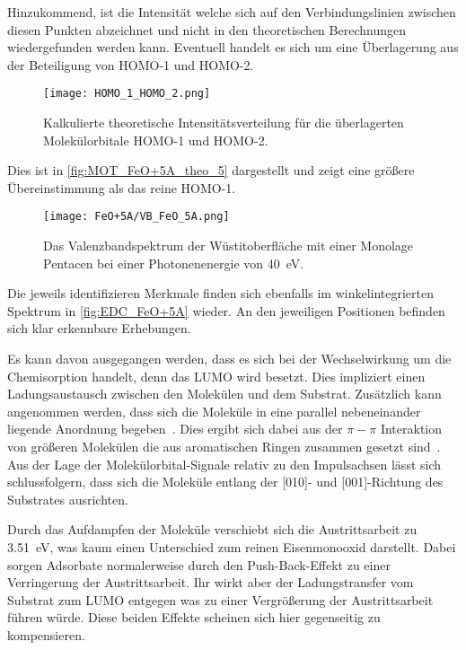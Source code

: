             Hinzukommend, ist die Intensität welche sich auf den Verbindungslinien zwischen diesen Punkten abzeichnet und nicht in den theoretischen Berechnungen wiedergefunden werden kann.
            Eventuell handelt es sich um eine Überlagerung aus der Beteiligung von HOMO-1 und HOMO-2.
            \begin{figure}
                \centering
                \texttt{[image: HOMO\_1\_HOMO\_2.png]}
                \caption{Kalkulierte theoretische Intensitätsverteilung für die überlagerten Molekülorbitale HOMO-1 und HOMO-2.} %
                \label{fig:MOT_FeO+5A_theo_5}
            \end{figure}
            Dies ist in \autoref{fig:MOT_FeO+5A_theo_5} dargestellt und zeigt eine größere Übereinstimmung als das reine HOMO-1.

            \begin{figure}
                \centering
                \texttt{[image: FeO+5A/VB\_FeO\_5A.png]}
                \caption{Das Valenzbandspektrum der Wüstitoberfläche mit einer Monolage Pentacen bei einer Photonenenergie von \SI{40}{\electronvolt}.}
                \label{fig:EDC_FeO+5A}
            \end{figure}
            Die jeweils identifizieren Merkmale finden sich ebenfalls im winkelintegrierten Spektrum in \autoref{fig:EDC_FeO+5A} wieder.
            An den jeweiligen Positionen befinden sich klar erkennbare Erhebungen.

            Es kann davon ausgegangen werden, dass es sich bei der Wechselwirkung um die Chemisorption handelt, denn das LUMO wird besetzt.
            Dies impliziert einen Ladungsaustausch zwischen den Molekülen und dem Substrat.
            Zusätzlich kann angenommen werden, dass sich die Moleküle in eine parallel nebeneinander liegende Anordnung begeben~\cite{IF_13}.
            Dies ergibt sich dabei aus der $\pi-\pi$ Interaktion von größeren Molekülen die aus aromatischen Ringen zusammen gesetzt sind~\cite{IF_13}.
            Aus der Lage der Molekülorbital-Signale relativ zu den Impulsachsen lässt sich schlussfolgern, dass sich die Moleküle entlang der [010]- und [001]-Richtung des Substrates ausrichten.

            Durch das Aufdampfen der Moleküle verschiebt sich die Austrittsarbeit zu \SI{3.51}{\electronvolt}, was kaum einen Unterschied zum reinen Eisenmonooxid darstellt.
            Dabei sorgen Adsorbate normalerweise durch den Push-Back-Effekt zu einer Verringerung der Austrittsarbeit.
            Ihr wirkt aber der Ladungstransfer vom Substrat zum LUMO entgegen was zu einer Vergrößerung der Austrittsarbeit führen würde.
            Diese beiden Effekte scheinen sich hier gegenseitig zu kompensieren.

